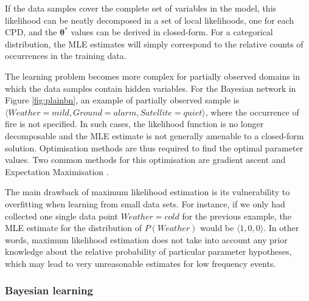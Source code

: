 If the data samples cover the complete set of variables in the model, this likelihood can be neatly decomposed in a set of local likelihoods, one for each CPD, and the $\boldsymbol\theta^*$ values can be derived in closed-form. For a categorical distribution,  the MLE estimates will simply correspond to the relative counts of occurrences in the training data. 


The learning problem becomes more complex for partially observed domains in which the data samples contain hidden variables.  For the Bayesian network in Figure \ref{fig:plainbn}, an example of partially observed sample is $\langle \mathit{Weather}\!=\!\mathit{mild}, \mathit{Ground}\!=\!alarm, \mathit{Satellite} \!=\!quiet\rangle$, where the occurrence of fire is not specified.  In such cases, the likelihood function is no longer decomposable and the MLE estimate is not generally amenable to a closed-form solution. Optimisation methods are thus required to find the optimal parameter values.  Two common methods for this optimisation are gradient ascent \citep{binder1997} and Expectation Maximisation \citep{green1990}. 

The main drawback of maximum likelihood estimation is its vulnerability to overfitting when learning from small data sets. For instance, if we only had collected one single data point $\mathit{Weather}\!=\!\mathit{cold}$ for the previous example, the MLE estimate for the distribution of $P(\mathit{Weather})$ would be $\langle 1, 0,0\rangle$.  In other words, maximum likelihood estimation does not take into account any prior knowledge about the relative probability of particular parameter hypotheses, which may lead to very unreasonable estimates for low frequency events. 

\subsubsection*{Bayesian learning}

